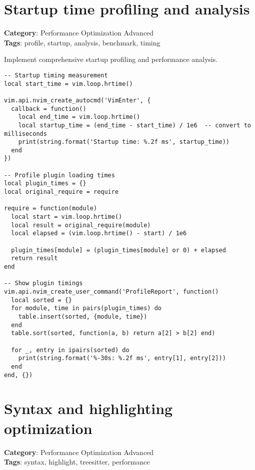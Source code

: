 {{{{{{{{{{\section{Startup time profiling and analysis}

\textbf{Category}: Performance Optimization Advanced\\ \textbf{Tags}: profile, startup, analysis, benchmark, timing
\vspace{0.5cm}

Implement comprehensive startup profiling and performance analysis.

\begin{Exa*}{}
\begin{Verbatim}[fontsize=\footnotesize, breaklines, breakanywhere]
-- Startup timing measurement
local start_time = vim.loop.hrtime()

vim.api.nvim_create_autocmd('VimEnter', {
  callback = function()
    local end_time = vim.loop.hrtime()
    local startup_time = (end_time - start_time) / 1e6  -- convert to milliseconds
    print(string.format('Startup time: %.2f ms', startup_time))
  end
})

-- Profile plugin loading times
local plugin_times = {}
local original_require = require

require = function(module)
  local start = vim.loop.hrtime()
  local result = original_require(module)
  local elapsed = (vim.loop.hrtime() - start) / 1e6
  
  plugin_times[module] = (plugin_times[module] or 0) + elapsed
  return result
end

-- Show plugin timings
vim.api.nvim_create_user_command('ProfileReport', function()
  local sorted = {}
  for module, time in pairs(plugin_times) do
    table.insert(sorted, {module, time})
  end
  table.sort(sorted, function(a, b) return a[2] > b[2] end)
  
  for _, entry in ipairs(sorted) do
    print(string.format('%-30s: %.2f ms', entry[1], entry[2]))
  end
end, {})
\end{Verbatim}
\end{Exa*}

\section{Syntax and highlighting optimization}

\textbf{Category}: Performance Optimization Advanced\\ \textbf{Tags}: syntax, highlight, treesitter, performance
\vspace{0.5cm}

}}}}}}}}}}
